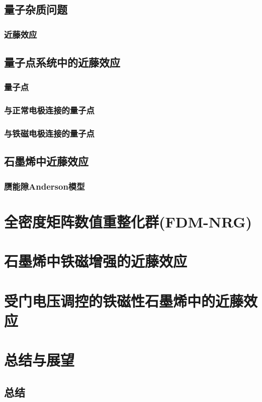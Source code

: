 \documentclass[twoside]{LZUthesis}
\begin{document}
\section{量子杂质问题}
\subsection{近藤效应}
\section{量子点系统中的近藤效应}
\subsection{量子点}
\subsection{与正常电极连接的量子点}
\subsection{与铁磁电极连接的量子点}
\section{石墨烯中近藤效应}
\subsection{赝能隙Anderson模型}

\chapter{全密度矩阵数值重整化群(FDM-NRG)}

\chapter{石墨烯中铁磁增强的近藤效应}


\chapter{受门电压调控的铁磁性石墨烯中的近藤效应}


\chapter{总结与展望}

\section{总结}
\end{document}
